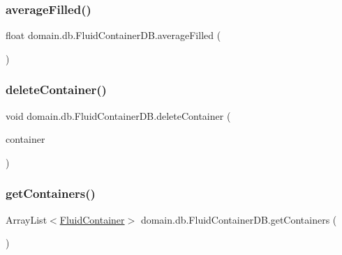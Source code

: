 \subsubsection{\texorpdfstring{average\+Filled()}{averageFilled()}}
{\footnotesize\ttfamily float domain.\+db.\+Fluid\+Container\+D\+B.\+average\+Filled (\begin{DoxyParamCaption}{ }\end{DoxyParamCaption})\hspace{0.3cm}{\ttfamily [inline]}}

\mbox{\label{classdomain_1_1db_1_1FluidContainerDB_a1b59e18960bac601c221cedee46a5e41}} 
\subsubsection{\texorpdfstring{delete\+Container()}{deleteContainer()}}
{\footnotesize\ttfamily void domain.\+db.\+Fluid\+Container\+D\+B.\+delete\+Container (\begin{DoxyParamCaption}\item[{\mbox{\hyperlink{classdomain_1_1model_1_1FluidContainer}{Fluid\+Container}}}]{container }\end{DoxyParamCaption})\hspace{0.3cm}{\ttfamily [inline]}}

\mbox{\label{classdomain_1_1db_1_1FluidContainerDB_a8f01e75570ae3a6dca1d7850252f55b6}} 
\subsubsection{\texorpdfstring{get\+Containers()}{getContainers()}}
{\footnotesize\ttfamily Array\+List$<$\mbox{\hyperlink{classdomain_1_1model_1_1FluidContainer}{Fluid\+Container}}$>$ domain.\+db.\+Fluid\+Container\+D\+B.\+get\+Containers (\begin{DoxyParamCaption}{ }\end{DoxyParamCaption})\hspace{0.3cm}{\ttfamily [inline]}}

